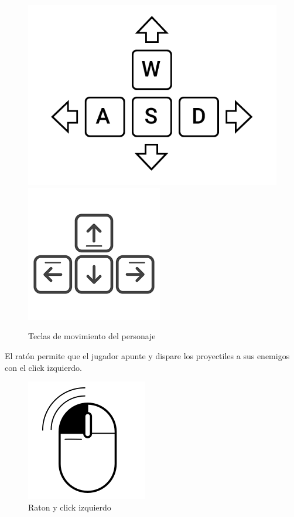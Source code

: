 \begin{figure}[H]
	\centering
	\includegraphics[scale=0.40]{imagenes/teclasWASD.png}
	\includegraphics[scale=0.50]{imagenes/flechas_teclado.png}
	\caption{\label{fig:flechasTeclado}Teclas de movimiento del personaje}
\end{figure}

El ratón permite que el jugador apunte y dispare los proyectiles a sus enemigos con el click izquierdo.

\begin{figure}[H]
	\centering
	\includegraphics[scale=0.50]{imagenes/raton.png}
	\caption{\label{fig:raton}Raton y click izquierdo}
\end{figure}

